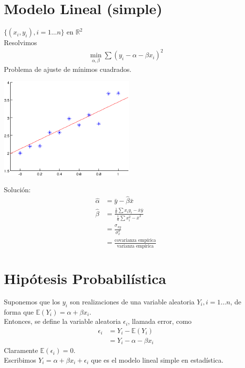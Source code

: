\documentclass[10pt]{article}
\theoremstyle{plain}
\theoremstyle{definition}
\begin{document}
\section{Modelo Lineal (simple)}
$\{(x_{i},y_{i}), i = 1\ldots n\}$ en $\mathbb{R}^2$\\
Resolvimos
\begin{align*}
\min_{\alpha, \beta} \sum (y_{i}-\alpha -\beta x_{i})^2
\end{align*}
Problema de ajuste de mínimos cuadrados.
\begin{center}
\includegraphics[scale=1]{imagenes/minimosCuadradosLineal.png}
\end{center}
Solución:
\begin{align*}
 \hat{\alpha} &= \bar{y} - \hat{\beta}\bar{x}\\
 \hat{\beta} &= \frac{\frac{1}{n}\sum x_{i}y_{i}- \bar{x}\bar{y}}{\frac{1}{n}\sum x_{i}^2 - \bar{x}^2}\\
 &= \frac{\sigma_{xy}}{\sigma_{x}^2}\\
 &= \frac{\text{covarianza empírica}}{\text{varianza empírica}}
\end{align*}
\section{Hipótesis Probabilística}
Suponemos que los $y_{i}$ son realizaciones de una variable aleatoria $Y_{i}, i = 1\ldots n$, de forma que $\mathbb{E}(Y_{i}) = \alpha + \beta x_{i}$.\\

Entonces, se define la variable aleatoria $\epsilon_{i}$, llamada error, como
\begin{align*}
\epsilon_{i} &= Y_{i} - \mathbb{E}(Y_{i})\\
&= Y_{i} - \alpha - \beta x_{i}
\end{align*}
Claramente $\mathbb{E}(\epsilon_{i}) = 0$.\\

Escribimos $Y_{i} = \alpha + \beta x_{i} + \epsilon_{i}$ que es el modelo lineal simple en estadística.\\
\end{document}

